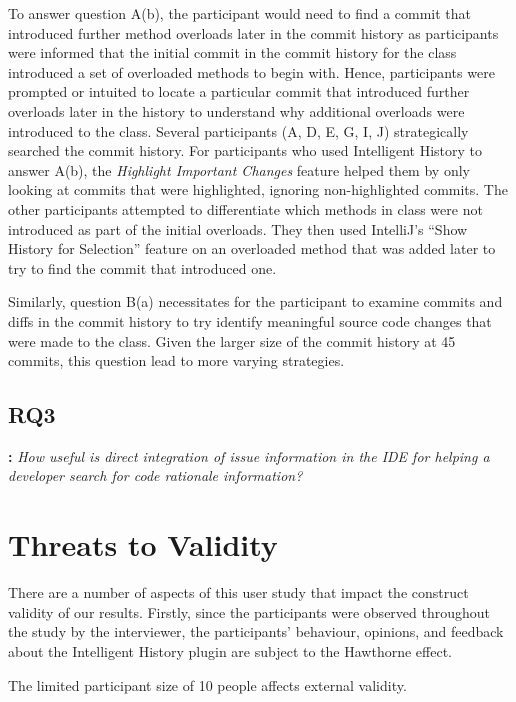 To answer question A(b), the participant would need to find a commit that introduced further  method overloads later in the commit history as participants were informed that the initial commit in the commit history for the  class introduced a set of overloaded  methods to begin with.
Hence, participants were prompted or intuited to locate a particular commit that introduced further overloads later in the history to understand why additional  overloads were introduced to the  class.
Several participants (A, D, E, G, I, J) strategically searched the commit history.
For participants who used Intelligent History to answer A(b), the \textit{Highlight Important Changes} feature helped them by only looking at commits that were highlighted, ignoring non-highlighted commits.
The other participants attempted to differentiate which  methods in class were not introduced as part of the initial overloads.
They then used IntelliJ's ``Show History for Selection'' feature on an  overloaded method that was added later to try to find the commit that introduced one.

Similarly, question B(a) necessitates for the participant to examine commits and diffs in the  commit history to try identify meaningful source code changes that were made to the class.
Given the larger size of the  commit history at 45 commits, this question lead to more varying strategies.

\subsection{RQ3}

\textbf{:} 
\textit{How useful is direct integration of issue information in the IDE for helping a developer search for code rationale information?}

\section{Threats to Validity}
\label{sec:Threads-to-Validity}

There are a number of aspects of this user study that impact the construct validity of our results.
Firstly, since the participants were observed throughout the study by the interviewer, the participants' behaviour, opinions, and feedback about the Intelligent History plugin are subject to the Hawthorne effect.

The limited participant size of 10 people affects external validity.


\endinput

Any text after an \endinput is ignored.
You could put scraps here or things in progress.